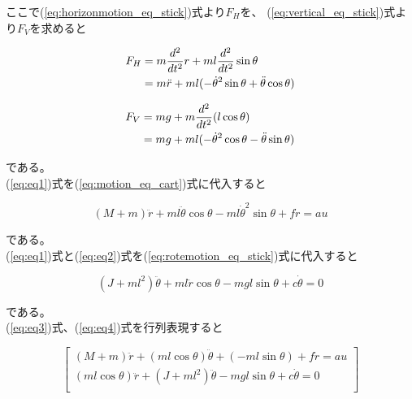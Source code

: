 	\noindent
	ここで(\ref{eq:horizonmotion_eq_stick})式より$F_{H}$を、
	(\ref{eq:vertical_eq_stick})式より$F_{V}$を求めると
	
	\begin{align}
		F_{H} &= m\frac{d^{2}}{dt^{2}}r + ml\frac{d^{2}}{dt^{2}}\sin{\theta} \notag \\
		&= m\ddot{r}+ml(-\dot{\theta}^{2}\sin{\theta}+\ddot{\theta}\cos{\theta})
		\label{eq:eq1}
	\end{align}
	
	\begin{align}
		F_{V} &= mg + m\frac{d^{2}}{dt^{2}}(l\cos{\theta}) \notag \\
		&= mg + ml(-\dot{\theta}^{2}\cos{\theta}-\ddot{\theta}\sin{\theta})
		\label{eq:eq2}
	\end{align}
	
	\noindent
	である。\\
	(\ref{eq:eq1})式を(\ref{eq:motion_eq_cart})式に代入すると
	
	\begin{equation}
		(M+m)\ddot{r} + ml\ddot{\theta}\cos{\theta}-ml\dot{\theta}^{2}\sin{\theta}+f\dot{r}=au
		\label{eq:eq3}
	\end{equation}
	
	\noindent
	である。\\
	(\ref{eq:eq1})式と(\ref{eq:eq2})式を(\ref{eq:rotemotion_eq_stick})式に代入すると
	
	\begin{equation}
		(J + ml^{2})\ddot{\theta} + ml\ddot{r}\cos{\theta} - mgl\sin{\theta} + c\dot{\theta} = 0
		\label{eq:eq4}
	\end{equation}
	
	\noindent
	である。\\
	(\ref{eq:eq3})式、(\ref{eq:eq4})式を行列表現すると
	
	\[
		\left[
		\begin{array}{ccc}
			(M + m)\ddot{r} + (ml\cos{\theta})\ddot{\theta} + (-ml\sin{\theta}) + f\dot{r} = au \\
			(ml\cos{\theta})\ddot{r} + (J + ml^{2})\ddot{\theta} -mgl\sin{\theta} + c\dot{\theta} = 0\\
		\end{array}
		\right]
	\]
	
